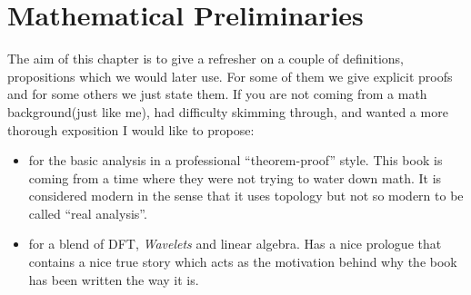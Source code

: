 \chapter{Mathematical Preliminaries}\label{ch:mathematical_preliminaries}
The aim of this chapter is to give a refresher on a couple of definitions, propositions which we would later use. 
For some of them we give explicit proofs and for some others we just state them. If you are not coming from a math 
background(just like me), had difficulty skimming through, and wanted a more thorough exposition 
I would like to propose:
\begin{itemize}
    \item \cite{Rudin1976} for the basic analysis in a professional ``theorem-proof'' style. This book is coming from a time 
    where they were not trying to water down math. It is considered modern in the sense that it uses topology but not so modern 
    to be called ``real analysis''. 
    \item \cite{Frazier1999} for a blend of \ac{DFT}, \emph{Wavelets} and linear algebra. Has a nice prologue that contains a nice true story which acts as the
     motivation behind why the book has been written the way it is. 
\end{itemize}

